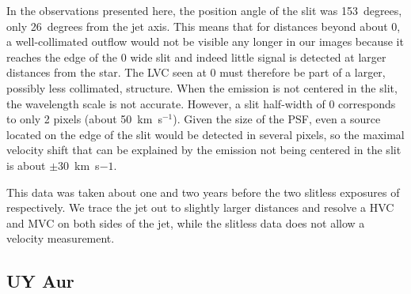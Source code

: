 \documentclass[twocolumn,trackchanges]{aastex63}
\begin{document}
In the observations presented here, the position angle of the slit was 153~degrees, only 26~degrees from the jet axis. This means that for distances beyond about 0, a well-collimated outflow would not be visible any longer in our images because it reaches the edge of the 0 wide slit and indeed little signal is detected at larger distances from the star. The LVC seen at 0 must therefore be part of a larger, possibly less collimated, structure. When the emission is not centered in the slit, the wavelength scale is not accurate. However, a slit half-width of 0 corresponds to only 2 pixels (about 50~km~s$^{-1}$). Given the size of the PSF, even a source located on the edge of the slit would be detected in several pixels, so the maximal velocity shift that can be explained by the emission not being centered in the slit is about $\pm30$~km~s${-1}$.

This data was taken about one and two years before the two slitless exposures of \citet{2004ApJ...609..261H} respectively. We trace the jet out to slightly larger distances and resolve a HVC and MVC on both sides of the jet, while the slitless data does not allow a velocity measurement.


\subsection{UY Aur}
\end{document}
